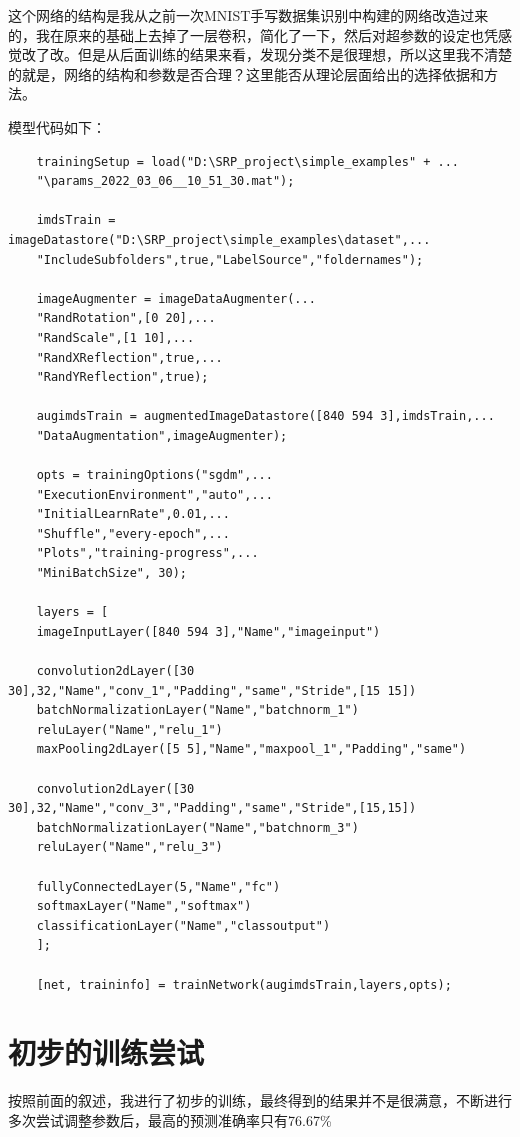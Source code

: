 \documentclass{article}
\begin{document}
	这个网络的结构是我从之前一次MNIST手写数据集识别中构建的网络改造过来的，我在原来的基础上去掉了一层卷积，简化了一下，然后对超参数的设定也凭感觉改了改。但是从后面训练的结果来看，发现分类不是很理想，所以这里我不清楚的就是，网络的结构和参数是否合理？这里能否从理论层面给出的选择依据和方法。
	
	模型代码如下：
	\begin{lstlisting}
	trainingSetup = load("D:\SRP_project\simple_examples" + ...
	"\params_2022_03_06__10_51_30.mat");
	
	imdsTrain = imageDatastore("D:\SRP_project\simple_examples\dataset",...
	"IncludeSubfolders",true,"LabelSource","foldernames");
	
	imageAugmenter = imageDataAugmenter(...
	"RandRotation",[0 20],...
	"RandScale",[1 10],...
	"RandXReflection",true,...
	"RandYReflection",true);
	
	augimdsTrain = augmentedImageDatastore([840 594 3],imdsTrain,...
	"DataAugmentation",imageAugmenter);
	
	opts = trainingOptions("sgdm",...
	"ExecutionEnvironment","auto",...
	"InitialLearnRate",0.01,...
	"Shuffle","every-epoch",...
	"Plots","training-progress",...
	"MiniBatchSize", 30);
	
	layers = [
	imageInputLayer([840 594 3],"Name","imageinput")
	
	convolution2dLayer([30 30],32,"Name","conv_1","Padding","same","Stride",[15 15])
	batchNormalizationLayer("Name","batchnorm_1")
	reluLayer("Name","relu_1")
	maxPooling2dLayer([5 5],"Name","maxpool_1","Padding","same")
	
	convolution2dLayer([30 30],32,"Name","conv_3","Padding","same","Stride",[15,15])
	batchNormalizationLayer("Name","batchnorm_3")
	reluLayer("Name","relu_3")
	
	fullyConnectedLayer(5,"Name","fc")
	softmaxLayer("Name","softmax")
	classificationLayer("Name","classoutput")
	];
	
	[net, traininfo] = trainNetwork(augimdsTrain,layers,opts);
	\end{lstlisting}
	
	\section{初步的训练尝试}
	
	按照前面的叙述，我进行了初步的训练，最终得到的结果并不是很满意，不断进行多次尝试调整参数后，最高的预测准确率只有76.67\%
	
\end{document}
